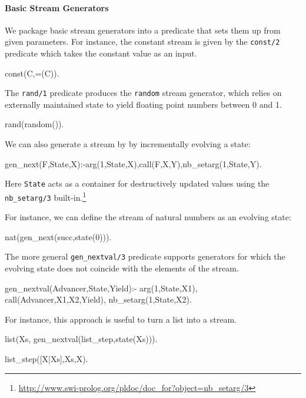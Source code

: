 \documentclass{new_tlp}
\begin{document}
\paragraph{Basic Stream Generators}
We package basic stream generators into a predicate that sets them up from
given parameters.
For instance, the constant stream is given by the {\tt const/2} predicate
which takes the constant value as an input.
\begin{code}
const(C,=(C)).
\end{code}

The {\tt rand/1} predicate produces the {\tt random} stream generator, which relies on externally maintained state
to yield floating point numbers between 0 and 1.
\begin{code}
rand(random()).
\end{code}

We can also generate a stream by by incrementally evolving a state:
\begin{code}
gen_next(F,State,X):-arg(1,State,X),call(F,X,Y),nb_setarg(1,State,Y).
\end{code}
Here {\tt State} acts as a container for destructively updated values using the
{\tt nb\_setarg/3} built-in.\footnote{\url{http://www.swi-prolog.org/pldoc/doc_for?object=nb_setarg/3}}


For instance, we can define the stream of natural numbers as an evolving state:
\begin{code}
nat(gen_next(succ,state(0))).
\end{code}

The more general {\tt gen\_nextval/3} predicate supports generators for which
the evolving state does not coincide with the elements of the stream.
\begin{code}
gen_nextval(Advancer,State,Yield):-
  arg(1,State,X1),
  call(Advancer,X1,X2,Yield),
  nb_setarg(1,State,X2).
\end{code}

For instance, this approach is useful to turn a list into a stream.
\begin{code}
list(Xs, gen_nextval(list_step,state(Xs))).

list_step([X|Xs],Xs,X).
\end{code}

% 
\end{document}
